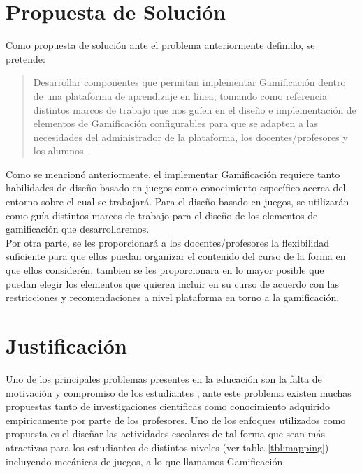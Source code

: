 \section{Propuesta de Solución}
\label{sec:propuesta}

    \noindent Como propuesta de solución ante el problema anteriormente definido, se pretende:
    
    \begin{quote}
    \colorbox{blue!05}{\parbox{\dimexpr\linewidth-2\fboxsep}{\strut%
        Desarrollar componentes que permitan implementar Gamificación dentro
        de una plataforma de aprendizaje en linea, tomando como referencia 
        distintos marcos de trabajo que nos guíen en el diseño e implementación
        de elementos de Gamificación configurables para que se adapten a las 
        necesidades del administrador de la plataforma, los docentes/profesores y 
        los alumnos.
    \strut}}%
    \end{quote}
    
\noindent Como se mencionó anteriormente, el implementar Gamificación requiere tanto habilidades de diseño basado en juegos como conocimiento específico acerca del entorno sobre el cual se trabajará. Para el diseño basado en juegos, se utilizarán como guía distintos marcos de trabajo para el diseño de los elementos de gamificación que desarrollaremos.\\

\noindent Por otra parte, se les proporcionará a los docentes/profesores la flexibilidad suficiente para que ellos puedan organizar el contenido del curso de la forma en que ellos considerén, tambien se les proporcionara en lo mayor posible que puedan elegir los elementos que quieren incluir en su curso de acuerdo con las restricciones y recomendaciones a nivel plataforma en torno a la gamificación.
    
\clearpage


\section{Justificación}
\label{sec:justificacion}


Uno de los principales problemas presentes en la educación son la falta de motivación y compromiso de los estudiantes \cite{objetivo1}, ante este problema existen muchas propuestas tanto de investigaciones científicas como conocimiento adquirido empiricamente por parte de los profesores. Uno de los enfoques utilizados como propuesta es el diseñar las actividades escolares de tal forma que sean más atractivas para los estudiantes de distintos niveles (ver tabla \ref{tbl:mapping}) incluyendo mecánicas de juegos, a lo que llamamos Gamificación.

